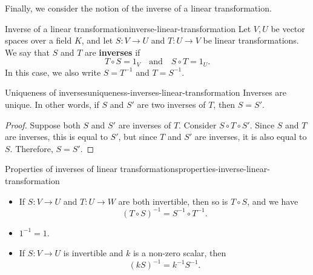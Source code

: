 Finally, we consider the notion of the inverse of a linear
transformation.

\begin{definition}{Inverse of a linear transformation}{inverse-linear-transformation}
  Let $V,U$ be vector spaces over a field $K$, and let $S:V\to U$ and
  $T:U\to V$ be linear transformations.  We say that $S$ and $T$ are
  \textbf{inverses}%
   if
  \begin{equation*}
    T\circ S = 1_V
    \quad\mbox{and}\quad
    S\circ T = 1_U.
  \end{equation*}
  In this case, we also write $S=T^{-1}$ and $T=S^{-1}$.  
\end{definition}

\begin{proposition}{Uniqueness of inverses}{uniqueness-inverses-linear-transformation}
  Inverses are unique. In other words, if $S$ and $S'$ are two inverses
  of $T$, then $S=S'$.
\end{proposition}

\begin{proof}
  Suppose both $S$ and $S'$ are inverses of $T$. Consider
  $S\circ T\circ S'$. Since $S$ and $T$ are inverses, this is equal to
  $S'$, but since $T$ and $S'$ are inverses, it is also equal to
  $S$. Therefore, $S=S'$.
\end{proof}

\begin{proposition}{Properties of inverses of linear transformations}{properties-inverse-linear-transformation}
  \begin{itemize}
  \item If $S:V\to U$ and $T:U\to W$ are both invertible, then so is
    $T\circ S$, and we have
    \begin{equation*}
      (T\circ S)^{-1} = S^{-1}\circ T^{-1}.
    \end{equation*}
  \item $1^{-1} = 1$.
  \item If $S:V\to U$ is invertible and $k$ is a non-zero scalar, then
    \begin{equation*}
      (kS)^{-1} = k^{-1}S^{-1}.
    \end{equation*}
  \end{itemize}
\end{proposition}
